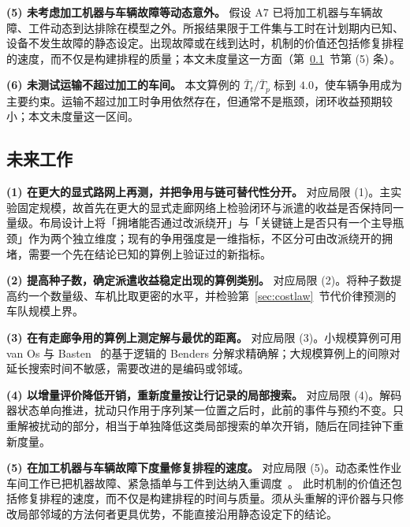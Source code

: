 \documentclass[manuscript,screen,review]{acmart}
\begin{document}
\textbf{(5) 未考虑加工机器与车辆故障等动态意外。}
假设 A7 已将加工机器与车辆故障、工件动态到达排除在模型之外。所报结果限于工件集与工时在计划期内已知、设备不发生故障的静态设定。出现故障或在线到达时，机制的价值还包括修复排程的速度，而不仅是构建排程的质量；本文未度量这一方面（第~\ref{sec:future_work}~节第 (5) 条）。

\textbf{(6) 未测试运输不超过加工的车间。}
本文算例的 $\bar{T}_t/\bar{T}_p$ 标到 $4.0$，使车辆争用成为主要约束。运输不超过加工时争用依然存在，但通常不是瓶颈，闭环收益预期较小；本文未度量这一区间。

\subsection{未来工作}
\label{sec:future_work}

\textbf{(1) 在更大的显式路网上再测，并把争用与链可替代性分开。}
对应局限 (1)。主实验固定规模，故首先在更大的显式走廊网络上检验闭环与派遣的收益是否保持同一量级。布局设计上将「拥堵能否通过改派绕开」与「关键链上是否只有一个主导瓶颈」作为两个独立维度；现有的争用强度是一维指标，不区分可由改派绕开的拥堵，需要一个先在结论已知的算例上验证过的新指标。

\textbf{(2) 提高种子数，确定派遣收益稳定出现的算例类别。}
对应局限 (2)。将种子数提高约一个数量级、车机比取更密的水平，并检验第~\ref{sec:costlaw}~节代价律预测的车队规模上界。

\textbf{(3) 在有走廊争用的算例上测定解与最优的距离。}
对应局限 (3)。小规模算例可用 van Os 与 Basten~\cite{vanos2026exact} 的基于逻辑的 Benders 分解求精确解；大规模算例上的间隙对延长搜索时间不敏感，需要改进的是编码或邻域。

\textbf{(4) 以增量评价降低开销，重新度量按让行记录的局部搜索。}
对应局限 (4)。解码器状态单向推进，扰动只作用于序列某一位置之后时，此前的事件与预约不变。只重解被扰动的部分，相当于单独降低这类局部搜索的单次开销，随后在同挂钟下重新度量。

\textbf{(5) 在加工机器与车辆故障下度量修复排程的速度。}
对应局限 (5)。动态柔性作业车间工作已把机器故障、紧急插单与工件到达纳入重调度~\cite{gui2023dynamic,zhao2026deep,dauzereperes2024fjsp}。
此时机制的价值还包括修复排程的速度，而不仅是构建排程的时间与质量。须从头重解的评价器与只修改局部邻域的方法何者更具优势，不能直接沿用静态设定下的结论。




\renewcommand{\refname}{参考文献}



\end{document}
